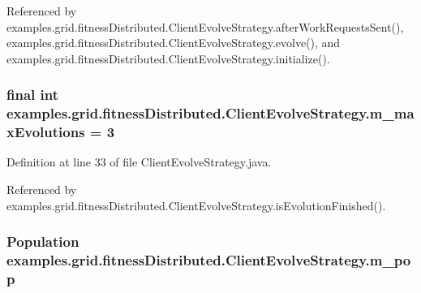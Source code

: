 Referenced by examples.\-grid.\-fitness\-Distributed.\-Client\-Evolve\-Strategy.\-after\-Work\-Requests\-Sent(), examples.\-grid.\-fitness\-Distributed.\-Client\-Evolve\-Strategy.\-evolve(), and examples.\-grid.\-fitness\-Distributed.\-Client\-Evolve\-Strategy.\-initialize().

\hypertarget{classexamples_1_1grid_1_1fitness_distributed_1_1_client_evolve_strategy_ab2a181827fc5cba31c595505808cb815}{
\subsubsection[{m\-\_\-max\-Evolutions}]{\setlength{\rightskip}{0pt plus 5cm}final int examples.\-grid.\-fitness\-Distributed.\-Client\-Evolve\-Strategy.\-m\-\_\-max\-Evolutions = 3\hspace{0.3cm}{\ttfamily [private]}}}\label{classexamples_1_1grid_1_1fitness_distributed_1_1_client_evolve_strategy_ab2a181827fc5cba31c595505808cb815}


Definition at line 33 of file Client\-Evolve\-Strategy.\-java.



Referenced by examples.\-grid.\-fitness\-Distributed.\-Client\-Evolve\-Strategy.\-is\-Evolution\-Finished().

\hypertarget{classexamples_1_1grid_1_1fitness_distributed_1_1_client_evolve_strategy_a3aa392e608c9e310d0d825880d69d6c9}{
\subsubsection[{m\-\_\-pop}]{\setlength{\rightskip}{0pt plus 5cm}Population examples.\-grid.\-fitness\-Distributed.\-Client\-Evolve\-Strategy.\-m\-\_\-pop\hspace{0.3cm}{\ttfamily [private]}}}\label{classexamples_1_1grid_1_1fitness_distributed_1_1_client_evolve_strategy_a3aa392e608c9e310d0d825880d69d6c9}


